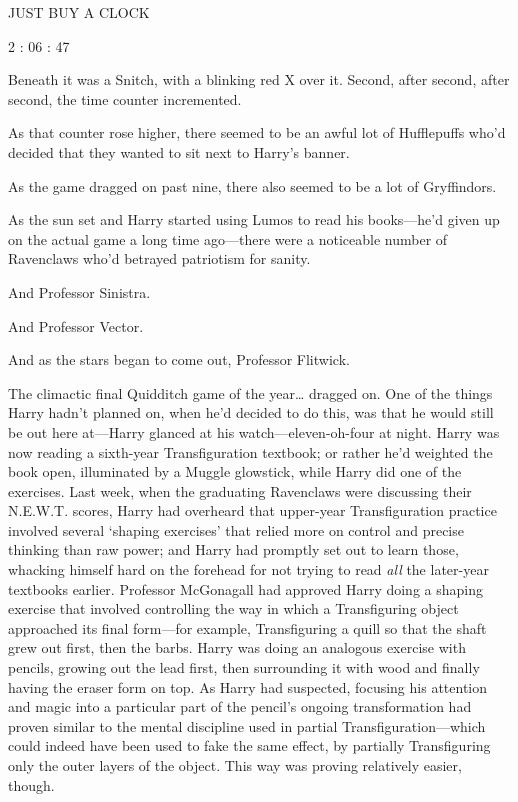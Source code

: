 \begin{center}
JUST BUY A CLOCK

2 : 06 : 47
\end{center}

Beneath it was a Snitch, with a blinking red X over it.
\sbreak
Second, after second, after second, the time counter incremented.

As that counter rose higher, there seemed to be an awful lot of Hufflepuffs 
who'd decided that they wanted to sit next to Harry's banner.

As the game dragged on past nine, there also seemed to be a lot of Gryffindors.

As the sun set and Harry started using Lumos to read his books---he'd given up 
on the actual game a long time ago---there were a noticeable number of 
Ravenclaws who'd betrayed patriotism for sanity.

And Professor Sinistra.

And Professor Vector.

And as the stars began to come out, Professor Flitwick.

The climactic final Quidditch game of the year{\ldots} dragged on.
\sbreak
One of the things Harry hadn't planned on, when he'd decided to do this, was 
that he would still be out here at---Harry glanced at his 
watch---eleven-oh-four at night. Harry was now reading a sixth-year 
Transfiguration textbook; or rather he'd weighted the book open, illuminated by 
a Muggle glowstick, while Harry did one of the exercises. Last week, when the 
graduating Ravenclaws were discussing their N.E.W.T. scores, Harry had 
overheard that upper-year Transfiguration practice involved several `shaping 
exercises' that relied more on control and precise thinking than raw power; and 
Harry had promptly set out to learn those, whacking himself hard on the 
forehead for not trying to read \emph{all} the later-year textbooks earlier. 
Professor McGonagall had approved Harry doing a shaping exercise that involved 
controlling the way in which a Transfiguring object approached its final 
form---for example, Transfiguring a quill so that the shaft grew out first, 
then the barbs. Harry was doing an analogous exercise with pencils, growing out 
the lead first, then surrounding it with wood and finally having the eraser 
form on top. As Harry had suspected, focusing his attention and magic into a 
particular part of the pencil's ongoing transformation had proven similar to 
the mental discipline used in partial Transfiguration---which could indeed have 
been used to fake the same effect, by partially Transfiguring only the outer 
layers of the object. This way was proving relatively easier, though.

